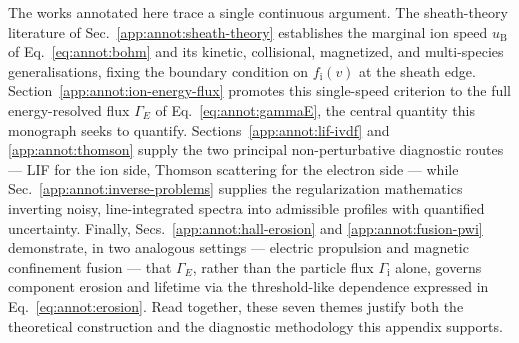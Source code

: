 The works annotated here trace a single continuous argument. The sheath-theory literature of Sec.~\ref{app:annot:sheath-theory} establishes the marginal ion speed $u_{\mathrm{B}}$ of Eq.~\eqref{eq:annot:bohm} and its kinetic, collisional, magnetized, and multi-species generalisations, fixing the boundary condition on $f_{\mathrm{i}}(v)$ at the sheath edge. Section~\ref{app:annot:ion-energy-flux} promotes this single-speed criterion to the full energy-resolved flux $\Gamma_{E}$ of Eq.~\eqref{eq:annot:gammaE}, the central quantity this monograph seeks to quantify. Sections~\ref{app:annot:lif-ivdf} and \ref{app:annot:thomson} supply the two principal non-perturbative diagnostic routes --- LIF for the ion side, Thomson scattering for the electron side --- while Sec.~\ref{app:annot:inverse-problems} supplies the regularization mathematics inverting noisy, line-integrated spectra into admissible profiles with quantified uncertainty. Finally, Secs.~\ref{app:annot:hall-erosion} and \ref{app:annot:fusion-pwi} demonstrate, in two analogous settings --- electric propulsion and magnetic confinement fusion --- that $\Gamma_{E}$, rather than the particle flux $\Gamma_{\mathrm{i}}$ alone, governs component erosion and lifetime via the threshold-like dependence expressed in Eq.~\eqref{eq:annot:erosion}. Read together, these seven themes justify both the theoretical construction and the diagnostic methodology this appendix supports.
